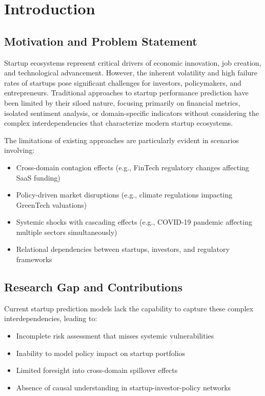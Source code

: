 \section{Introduction}

\subsection{Motivation and Problem Statement}

Startup ecosystems represent critical drivers of economic innovation, job creation, and technological advancement. However, the inherent volatility and high failure rates of startups pose significant challenges for investors, policymakers, and entrepreneurs. Traditional approaches to startup performance prediction have been limited by their siloed nature, focusing primarily on financial metrics, isolated sentiment analysis, or domain-specific indicators without considering the complex interdependencies that characterize modern startup ecosystems.

The limitations of existing approaches are particularly evident in scenarios involving:
\begin{itemize}
    \item Cross-domain contagion effects (e.g., FinTech regulatory changes affecting SaaS funding)
    \item Policy-driven market disruptions (e.g., climate regulations impacting GreenTech valuations)
    \item Systemic shocks with cascading effects (e.g., COVID-19 pandemic affecting multiple sectors simultaneously)
    \item Relational dependencies between startups, investors, and regulatory frameworks
\end{itemize}

\subsection{Research Gap and Contributions}

Current startup prediction models lack the capability to capture these complex interdependencies, leading to:
\begin{itemize}
    \item Incomplete risk assessment that misses systemic vulnerabilities
    \item Inability to model policy impact on startup portfolios
    \item Limited foresight into cross-domain spillover effects
    \item Absence of causal understanding in startup-investor-policy networks
\end{itemize}

